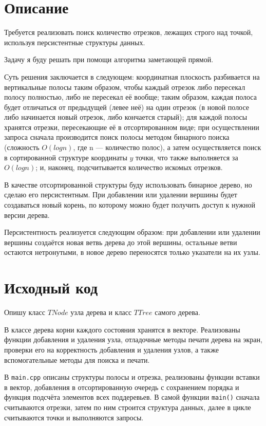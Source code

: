 \section{Описание}
Требуется реализовать поиск количество отрезков, лежащих строго над точкой, используя персистентные структуры данных.

Задачу я буду решать при помощи алгоритма заметающей прямой. 

Суть решения заключается в следующем: координатная плоскость разбивается на вертикальные полосы таким образом, чтобы каждый отрезок либо пересекал полосу полностью, либо не пересекал её вообще; таким образом, каждая полоса будет отличаться от предыдущей (левее неё) на один отрезок (в новой полосе либо начинается новый отрезок, либо кончается старый); для каждой полосы хранятся отрезки, пересекающие её в отсортированном виде; при осуществлении запроса сначала производится поиск полосы методом бинарного поиска (сложность $O(logn)$, где n --- количество полос), а затем осуществляется поиск в сортированной структуре координаты $y$ точки, что также выполняется за $O(logn)$; и, наконец, подсчитывается количество искомых отрезков.

В качестве отсортированной структуры буду использовать бинарное дерево, но сделаю его персистентным. При добавлении или удалении вершины будет создаваться новый корень, по которому можно будет получить доступ к нужной версии дерева.

Персистентность реализуется следующим образом: при добавлении или удалении вершины создаётся новая ветвь дерева до этой вершины, остальные ветви остаются нетронутыми, в новое дерево переносятся только указатели на их узлы.

\pagebreak

\section{Исходный код}
Опишу класс $TNode$ узла дерева и класс $TTree$ самого дерева. 

В классе дерева корни каждого состояния хранятся в векторе. Реализованы функции добавления и удаления узла, отладочные методы печати дерева на экран, проверки его на корректность добавления и удаления узлов, а также вспомогательные методы для поиска и печати. 

В \texttt{main.cpp} описаны структуры полосы и отрезка, реализованы функции вставки в вектор, добавления в отсортированную очередь с сохранением порядка и функция подсчёта элементов всех поддеревьев. В самой функции \texttt{main()} сначала считываются отрезки, затем по ним строится структура данных, далее в цикле считываются точки и выполняются запросы.

